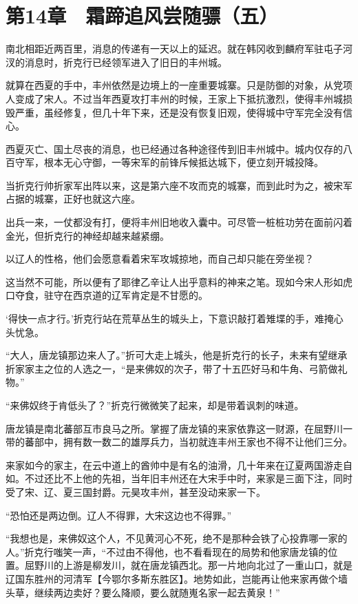 \section{第14章　霜蹄追风尝随骠（五）}

南北相距近两百里，消息的传递有一天以上的延迟。就在韩冈收到麟府军驻屯子河汊的消息时，折克行已经领军进入了旧日的丰州城。

就算在西夏的手中，丰州依然是边境上的一座重要城寨。只是防御的对象，从党项人变成了宋人。不过当年西夏攻打丰州的时候，王家上下抵抗激烈，使得丰州城损毁严重，虽经修复，但几十年下来，还是没有恢复旧观，使得城中守军完全没有信心。

西夏灭亡、国土尽丧的消息，也已经通过各种途径传到旧丰州城中。城内仅存的八百守军，根本无心守御，一等宋军的前锋斥候抵达城下，便立刻开城投降。

当折克行帅折家军出阵以来，这是第六座不攻而克的城寨，而到此时为之，被宋军占据的城寨，正好也就这六座。

出兵一来，一仗都没有打，便将丰州旧地收入囊中。可尽管一桩桩功劳在面前闪着金光，但折克行的神经却越来越紧绷。

以辽人的性格，他们会愿意看着宋军攻城掠地，而自己却只能在旁坐视？

这当然不可能，所以便有了耶律乙辛让人出乎意料的神来之笔。现如今宋人形如虎口夺食，驻守在西京道的辽军肯定是不甘愿的。

‘得快一点才行。’折克行站在荒草丛生的城头上，下意识敲打着雉堞的手，难掩心头忧急。

“大人，唐龙镇那边来人了。”折可大走上城头，他是折克行的长子，未来有望继承折家家主之位的人选之一，“是来佛奴的次子，带了十五匹好马和牛角、弓箭做礼物。”

“来佛奴终于肯低头了？”折克行微微笑了起来，却是带着讽刺的味道。

唐龙镇是南北蕃部互市良马之所。掌握了唐龙镇的来家依靠这一财源，在屈野川一带的蕃部中，拥有数一数二的雄厚兵力，当初就连丰州王家也不得不让他们三分。

来家如今的家主，在云中道上的酋帅中是有名的油滑，几十年来在辽夏两国游走自如。不过还比不上他的先祖，当年旧丰州还在大宋手中时，来家是三面下注，同时受了宋、辽、夏三国封爵。元昊攻丰州，甚至没动来家一下。

“恐怕还是两边倒。辽人不得罪，大宋这边也不得罪。”

“我想也是，来佛奴这个人，不见黄河心不死，绝不是那种会铁了心投靠哪一家的人。”折克行嗤笑一声，“不过由不得他，也不看看现在的局势和他家唐龙镇的位置。屈野川的上游是柳发川，就在唐龙镇西北。那一片地向北过了一重山口，就是辽国东胜州的河清军【今鄂尔多斯东胜区】。地势如此，岂能再让他来家再做个墙头草，继续两边卖好？要么降顺，要么就随嵬名家一起去黄泉！”

